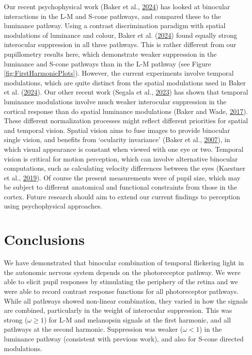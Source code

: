 \documentclass[
]{article}
\begin{document}
Our recent psychophysical work (Baker et al., \protect\hyperlink{ref-Baker2024}{2024}) has looked at binocular interactions in the L-M and S-cone pathways, and compared these to the luminance pathway. Using a contrast discrimination paradigm with spatial modulations of luminance and colour, Baker et al. (\protect\hyperlink{ref-Baker2024}{2024}) found equally strong interocular suppression in all three pathways. This is rather different from our pupillometry results here, which demonstrate weaker suppression in the luminance and S-cone pathways than in the L-M pathway (see Figure \ref{fig:FirstHarmonicPlots}). However, the current experiments involve temporal modulations, which are quite distinct from the spatial modulations used in Baker et al. (\protect\hyperlink{ref-Baker2024}{2024}). Our other recent work (Segala et al., \protect\hyperlink{ref-Segala2023}{2023}) has shown that temporal luminance modulations involve much weaker interocular suppression in the cortical response than do spatial luminance modulations (Baker and Wade, \protect\hyperlink{ref-Baker2017}{2017}). These different normalization processes might reflect different priorities for spatial and temporal vision. Spatial vision aims to fuse images to provide binocular single vision, and benefits from `ocularity invariance' (Baker et al., \protect\hyperlink{ref-Baker2007}{2007}), in which visual appearance is constant when viewed with one eye or two. Temporal vision is critical for motion perception, which can involve alternative binocular computations, such as calculating velocity differences between the eyes (Kaestner et al., \protect\hyperlink{ref-Kaestner2019}{2019}). Of course the present measurements were of pupil size, which may be subject to different anatomical and functional constraints from those in the cortex. Future research should aim to extend our current findings to perception using psychophysical approaches.

\hypertarget{conclusions}{%
\section{Conclusions}\label{conclusions}}

We have demonstrated that binocular combination of temporal flickering light in the autonomic nervous system depends on the photoreceptor pathway. We were able to elicit pupil responses by stimulating the periphery of the retina and we were able to record contrast response functions for all photoreceptor pathways. While all pathways showed non-linear combination, they varied in how the signals are combined, particularly in the weight of interocular suppression. This was strong (\(\omega \ge 1\)) for L-M and melanopsin signals at the first harmonic, and all pathways at the second harmonic. Suppression was weaker (\(\omega < 1\)) in the luminance pathway (consistent with previous work), and also for S-cone directed modulations.
\end{document}
